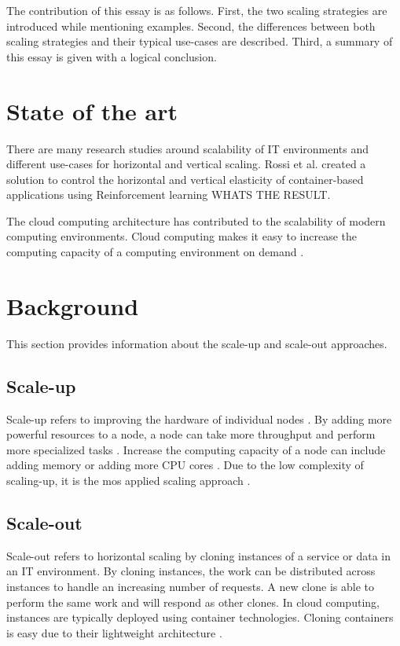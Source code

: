 \documentclass{article}
\begin{document}
The contribution of this essay is as follows. First, the two scaling strategies are introduced while mentioning examples. Second, the differences between both scaling strategies and their typical use-cases are described. Third, a summary of this essay is given with a logical conclusion.


\section{State of the art}
There are many research studies around scalability of IT environments and different use-cases for horizontal and vertical scaling. Rossi et al. \cite{Rossi2019HorAndVert} created a solution to control the horizontal and vertical elasticity of container-based applications using Reinforcement learning  WHATS THE RESULT. 

The cloud computing architecture has contributed to the scalability of modern computing environments. Cloud computing makes it easy to increase the computing capacity of a computing environment on demand \cite{Mahmood2013CloudConcepts}.


\section{Background}

This section provides information about the scale-up and scale-out approaches.

\subsection{Scale-up}
Scale-up refers to improving the hardware of individual nodes \cite{Wilder2012CloudPatterns}. By adding more powerful resources to a node, a node can take more throughput and perform more specialized tasks \cite{Abbott2015ScalabilityArt}.
Increase the computing capacity of a node can include adding memory or adding more CPU cores \cite{Wilder2012CloudPatterns}.
Due to the low complexity of scaling-up, it is the mos applied scaling approach \cite{Wilder2012CloudPatterns}.


\subsection{Scale-out}
Scale-out refers to horizontal scaling by cloning instances of a service or data in an IT environment. By cloning instances, the work can be distributed across instances to handle an increasing number of requests. A new clone is able to perform the same work and will respond as other clones.
In cloud computing, instances are typically deployed using container technologies. Cloning containers is easy due to their lightweight architecture \cite{Abbott2015ScalabilityArt}.
\end{document}
